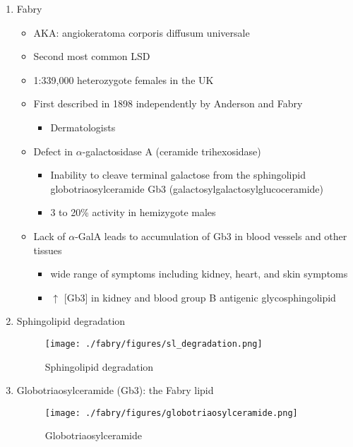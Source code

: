 \documentclass{scrartcl}
\begin{document}
\begin{enumerate}
\item Fabry
\label{sec:org1d966cf}

\begin{itemize}
\item AKA: angiokeratoma corporis diffusum universale
\item Second most common LSD
\item 1:339,000 heterozygote females in the UK
\item First described in 1898 independently by Anderson and Fabry
\begin{itemize}
\item Dermatologists
\end{itemize}
\item Defect in \(\alpha\)-galactosidase A (ceramide trihexosidase)
\begin{itemize}
\item Inability to cleave terminal galactose from the sphingolipid globotriaosylceramide Gb3 (galactosylgalactosylglucoceramide)
\item 3 to 20\% activity in hemizygote males
\end{itemize}
\item Lack of \(\alpha\)-GalA leads to accumulation of Gb3 in blood vessels and other tissues
\begin{itemize}
\item wide range of symptoms including kidney, heart, and skin symptoms
\item \(\uparrow\) [Gb3] in kidney and blood group B antigenic glycosphingolipid
\end{itemize}
\end{itemize}

\item Sphingolipid degradation
\label{sec:org1cd1a69}

\begin{figure}[htbp]
\centering
\texttt{[image: ./fabry/figures/sl\_degradation.png]}
\caption[Sphingolipid degradation]{\label{fig:org4bbfdd9}
Sphingolipid degradation}
\end{figure}


\item Globotriaosylceramide (Gb3): the Fabry lipid
\label{sec:orge7307d1}
\begin{figure}[htbp]
\centering
\texttt{[image: ./fabry/figures/globotriaosylceramide.png]}
\caption[Globotriaosylceramide]{\label{fig:orgd67607c}
Globotriaosylceramide}
\end{figure}


\end{enumerate}
\end{document}
